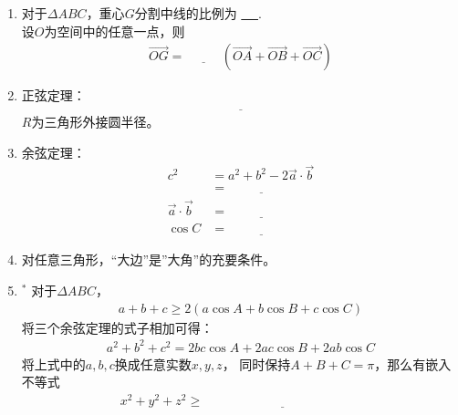 \documentclass{article}
\newif\ifte
\renewcommand{\vec}{\overrightarrow}
\renewcommand\geq\geqslant
\begin{document}
\begin{multicols}{2}
\begin{enumerate}[leftmargin=20pt]
\item 对于$ \Delta ABC $，重心$ G $分割中线的比例为
\underline{\ \ifte 1:2\else \hspace{1cm} \fi\ }. \\
设$ O $为空间中的任意一点，则
\begin{align*}
    \vec{OG}=\underline{\ \ifte \dfrac{1}{3}
    \else \hspace{1cm} \fi\ } (\vec{OA}+\vec{OB}+\vec{OC})
\end{align*}

\item 正弦定理：
\begin{gather*}
    \underline{\ \ifte \dfrac{a}{\sin A}=\dfrac{b}{\sin B}=
        \dfrac{c}{\sin C} =2R \else \hspace{5cm} \fi\ }
\end{gather*}
$ R $为三角形外接圆半径。

\item 余弦定理：
\begin{align*}
    c^2 &=a^2+b^2-2\vec{a}\cdot\vec{b} \\
        &=\underline{\ \ifte a^2+b^2-2ab\cos C
          \else \hspace{2cm} \fi\ }  \\
    \vec{a}\cdot\vec{b} &=\underline{\ \ifte 
    \dfrac{a^2+b^2-c^2}{2} \else \hspace{2cm} \fi\ } \\
    \cos C &=\underline{\ \ifte 
        \dfrac{a^2+b^2-c^2}{2ab} \else \hspace{2cm} \fi\ }
\end{align*}

\item 对任意三角形，“大边”是”大角”的充要条件。

\item $^*$ 对于$ \Delta ABC $，
\begin{align*}
    a+b+c\geq 2(a\cos A+b\cos B+ c\cos C)
\end{align*}
将三个余弦定理的式子相加可得：
\begin{gather*}
    a^2+b^2+c^2=2bc\cos A+2ac\cos B+ 2ab\cos C
\end{gather*}
将上式中的$ a,b,c $换成任意实数$ x,y,z $，
同时保持$ A+B+C=\pi $，那么有嵌入不等式
\begin{align*}
    x^2+y^2+z^2 \geq \underline{\ \ifte 2yz\cos A+
    2zx\cos B + 2xy\cos C\else \hspace{5cm} \fi\ }
\end{align*}


\end{enumerate}
\end{multicols}
\end{document}
